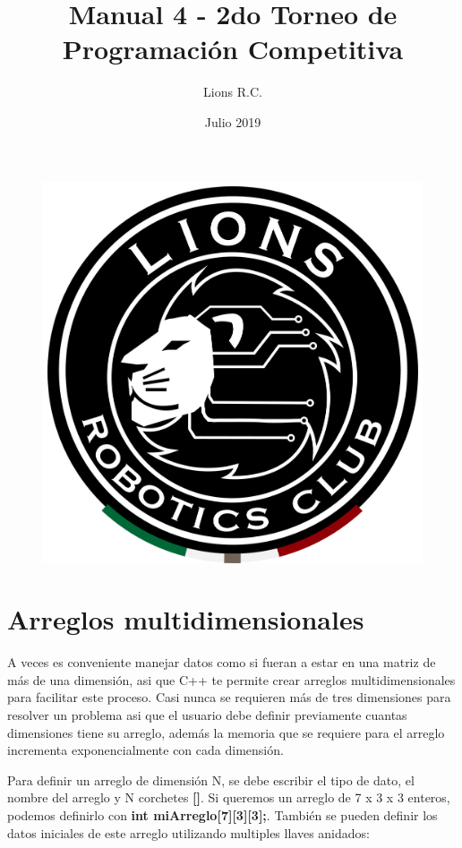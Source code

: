 \documentclass{article}
\title{Manual 4 - 2do Torneo de Programación Competitiva}
\author{Lions R.C.}
\date{Julio 2019}
\begin{document}
\maketitle

\tableofcontents

\begin{figure}[H]
    \centering
    \includegraphics[width=0.2\paperwidth]{newblack}
\end{figure}

\section{Arreglos multidimensionales}

A veces es conveniente manejar datos como si fueran a estar en una matriz de más de una dimensión, asi que C++ te permite crear arreglos multidimensionales para facilitar este proceso. Casi nunca se requieren más de tres dimensiones para resolver un problema asi que el usuario debe definir previamente cuantas dimensiones tiene su arreglo, además la memoria que se requiere para el arreglo incrementa exponencialmente con cada dimensión.

Para definir un arreglo de dimensión N, se debe escribir el tipo de dato, el nombre del arreglo y N corchetes \textbf{[]}. Si queremos un arreglo de 7 x 3 x 3 enteros, podemos definirlo con \textbf{int miArreglo[7][3][3];}. También se pueden definir los datos iniciales de este arreglo utilizando multiples llaves anidados:
\end{document}
